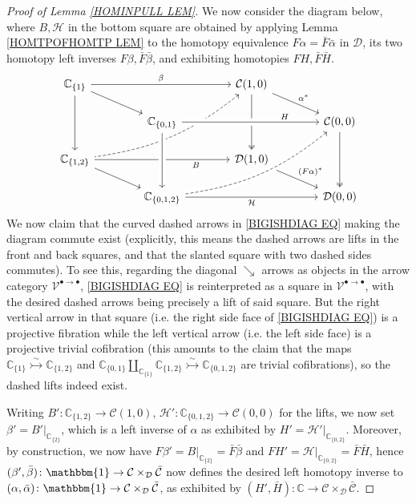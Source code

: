 \documentclass[a4paper,10pt
,draft
]{article}%
\numberwithin{equation}{section}
\numberwithin{figure}{section}
\theoremstyle{definition} %
\newcommand{\V}{\ensuremath{\mathcal V}}
\newcommand{\1}{\ensuremath{\mathbbm 1}}%
\begin{document}
\begin{proof}[Proof of Lemma \ref{HOMINPULL LEM}]
	We now consider the diagram below, 
	where $B, \mathcal{H}$ in the bottom square
	are obtained by applying Lemma \ref{HOMTPOFHOMTP LEM}
	to the homotopy equivalence 
	$F\alpha = \bar{F} \bar{\alpha}$ in $\mathcal{D}$,
	its two homotopy left inverses
	$F\beta, \bar{F} \bar{\beta}$,
	and exhibiting homotopies
	$F H, \bar{F} \bar{H}$.
	\begin{equation}\label{BIGISHDIAG EQ}
	\begin{tikzcd}[row sep = 15pt,column sep = 40pt]
	\mathbb{C}_{\{1\}} 	\ar{rr}{\beta} \ar{rd} \ar{dd}&&
	\mathcal{C}(1,0) \ar[twoheadrightarrow]{dd} \ar{dr}{\alpha^{\**}}
	\ar[dashed,leftarrow,bend left =15]{ddll}
	\\
	&
	\mathbb{C}_{\{0,1\}} \arrow[crossing over]{rr}[near end]{H} &&
	\mathcal{C}(0,0)  
	\ar[twoheadrightarrow]{dd}
	\\
	\mathbb{C}_{\{1,2\}} \ar{rr}[swap,near end]{B} \ar{rd} &&
	\mathcal{D}(1,0) \ar{rd}{(F\alpha)^{\**}}
	\\
	&
	\mathbb{C}_{\{0,1,2\}}
	\ar[dashed,bend right =15,crossing over]{uurr}
	\ar{rr}[swap]{\mathcal{H}} \arrow[uu, leftarrow, crossing over] &&
	\mathcal{D}(0,0)
	\end{tikzcd}
	\end{equation}
	We now claim that the curved dashed arrows in 
	\eqref{BIGISHDIAG EQ}
	making the diagram commute exist
	(explicitly, this means the dashed arrows are lifts in the front and back squares, and that the slanted square with two dashed sides commutes).
	To see this, regarding the diagonal $\searrow$ arrows as objects in the arrow category $\V^{\bullet \to \bullet}$, 
	\eqref{BIGISHDIAG EQ}
	is reinterpreted as a square in $\V^{\bullet \to \bullet}$,
	with the desired dashed arrows being precisely a lift of said square.
	But the right vertical arrow in that square
	(i.e. the right side face of \eqref{BIGISHDIAG EQ}) is a projective fibration 
	while the left vertical arrow 
	(i.e. the left side face)
	is a projective trivial cofibration
	(this amounts to the claim that the maps
	$\mathbb{C}_{\{1\}} \overset{\sim}{\rightarrowtail} \mathbb{C}_{\{1,2\}}$ and
	$\mathbb{C}_{\{0,1\}} \amalg_{\mathbb{C}_{\{1\}}} \mathbb{C}_{\{1,2\}} \overset{\sim}{\rightarrowtail} \mathbb{C}_{\{0,1,2\}}$
	are trivial cofibrations),
	so the dashed lifts indeed exist.
	
	Writing 
	$B'\colon \mathbb{C}_{\{1,2\}} \to \mathcal{C}(1,0)$,
	$\mathcal{H}' \colon \mathbb{C}_{\{0,1,2\}} \to \mathcal{C}(0,0)$
	for the lifts,
	we now set
	$\beta' = B'|_{\mathbb{C}_{\{2\}}}$,
	which is a left inverse of $\alpha$
	as exhibited by $H' = \mathcal{H}'|_{\mathbb{C}_{\{0,2\}}}$.
	Moreover, by construction, we now have
	$F\beta' = B|_{\mathbb{C}_{\{2\}}} = \bar{F} \bar{\beta}$
	and 
	$FH' = \mathcal{H}|_{\mathbb{C}_{\{0,2\}}} = \bar{F} \bar{H}$,
	hence
	$(\beta',\bar{\beta})\colon \mathbbm{1} \to
	\mathcal{C} \times_{\mathcal{D}}\bar{\mathcal{C}}$
	now defines the desired left homotopy inverse to 
	$(\alpha,\bar{\alpha}) \colon \mathbbm{1} \to
	\mathcal{C} \times_{\mathcal{D}}\bar{\mathcal{C}}$,
	as exhibited by
	$(H',\bar{H}) \colon \mathbb{C} \to
	\mathcal{C} \times_{\mathcal{D}}\bar{\mathcal{C}}$.
\end{proof}






{}

\end{document}
